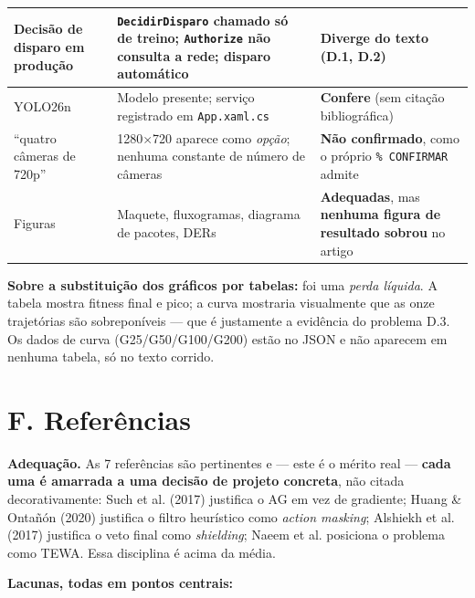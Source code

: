 \documentclass[11pt,a4paper]{article}
\begin{document}
\begin{longtable}{|p{3.6cm}|p{6.4cm}|p{4.6cm}|}
\hline
Decisão de disparo em produção & \texttt{DecidirDisparo} chamado só de treino;
\texttt{Authorize} não consulta a rede; disparo automático &
\textbf{Diverge do texto} (D.1, D.2) \\
\hline
YOLO26n & Modelo presente; serviço registrado em \texttt{App.xaml.cs} &
\textbf{Confere} (sem citação bibliográfica) \\
\hline
``quatro câmeras de 720p'' & 1280$\times$720 aparece como \emph{opção}; nenhuma constante de
número de câmeras & \textbf{Não confirmado}, como o próprio \texttt{\% CONFIRMAR} admite \\
\hline
Figuras & Maquete, fluxogramas, diagrama de pacotes, DERs & \textbf{Adequadas}, mas
\textbf{nenhuma figura de resultado sobrou} no artigo \\
\hline
\end{longtable}

\textbf{Sobre a substituição dos gráficos por tabelas:} foi uma \emph{perda líquida}. A tabela mostra
fitness final e pico; a curva mostraria visualmente que as onze trajetórias são sobreponíveis --- que
é justamente a evidência do problema D.3. Os dados de curva (G25/G50/G100/G200) estão no JSON e não
aparecem em nenhuma tabela, só no texto corrido.

\section*{F. Referências}

\textbf{Adequação.} As 7 referências são pertinentes e --- este é o mérito real --- \textbf{cada uma
é amarrada a uma decisão de projeto concreta}, não citada decorativamente: Such et al. (2017)
justifica o AG em vez de gradiente; Huang \& Ontañón (2020) justifica o filtro heurístico como
\emph{action masking}; Alshiekh et al. (2017) justifica o veto final como \emph{shielding}; Naeem et
al. posiciona o problema como TEWA. Essa disciplina é acima da média.

\textbf{Lacunas, todas em pontos centrais:}
\end{document}
